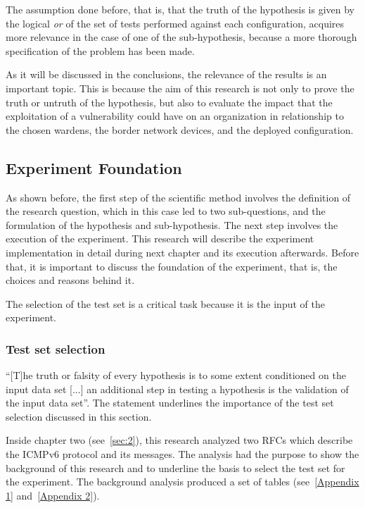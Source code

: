 \documentclass[12pt]{article}
\begin{document}
The assumption done before, that is, that the truth of the hypothesis is given by the logical \textit{or} of the set of tests performed against each configuration, acquires more relevance in the case of one of the sub-hypothesis, because a more thorough specification of the problem has been made.

As it will be discussed in the conclusions, the relevance of the results is an important topic. This is because the aim of this research is not only to prove the truth or untruth of the hypothesis, but also to evaluate the impact that the exploitation of a vulnerability could have on an organization in relationship to the chosen wardens, the border network devices, and the deployed configuration.

\subsection{Experiment Foundation}
\label{sub:expFound}

As shown before, the first step of the scientific method involves the definition of the research question, which in this case led to two sub-questions, and the formulation of the hypothesis and sub-hypothesis. The next step involves the execution of the experiment. This research will describe the experiment implementation in detail during next chapter and its execution afterwards. Before that, it is important to discuss the foundation of the experiment, that is, the choices and reasons behind it.

The selection of the test set is a critical task because it is the input of the experiment.

\subsubsection{Test set selection}
\label{subsub:testSel}

``[T]he truth or falsity of every hypothesis is to some extent conditioned on the input data set [...] an additional step in testing a hypothesis is the validation of the input data set''\cite{secExperiments}. The statement underlines the importance of the test set selection discussed in this section.

Inside chapter two (see~\ref{sec:2}), this research analyzed two RFCs which describe the ICMPv6 protocol and its messages. The analysis had the purpose to show the background of this research and to underline the basis to select the test set for the experiment. The background analysis produced a set of tables (see~\ref{Appendix 1} and~\ref{Appendix 2}). 
\end{document}
